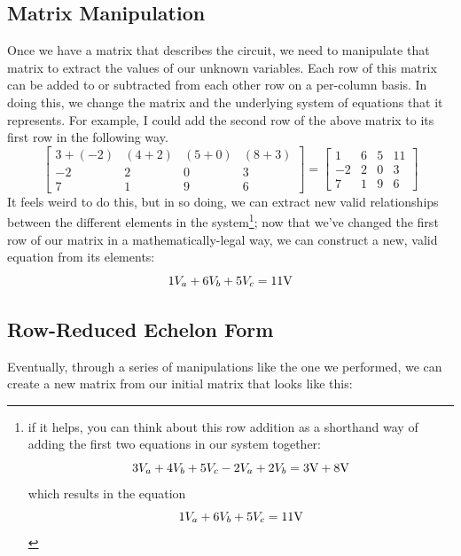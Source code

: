 \subsection{Matrix Manipulation}
Once we have a matrix that describes the circuit, we need to manipulate that matrix to extract the values of our unknown variables. Each row of this matrix can be added to or subtracted from each other row on a per-column basis. In doing this, we change the matrix and the underlying system of equations that it represents. For example, I could add the second row of the above matrix to its first row in the following way.
$$
\begin{bmatrix}
    3 + (-2)   & (4+2) & (5+0) & (8+3) \\
    -2  & 2 & 0 & 3 \\
    7   & 1 & 9 & 6
\end{bmatrix} 
=
\begin{bmatrix}
    1   & 6 & 5 & 11 \\
    -2  & 2 & 0 & 3 \\
    7   & 1 & 9 & 6
\end{bmatrix} 
$$
It feels weird to do this, but in so doing, we can extract new valid relationships between the different elements in the system\footnote{if it helps, you can think about this row addition as a shorthand way of adding the first two equations in our system together: $$3V_a + 4V_b + 5V_c 
-2V_a + 2V_b = 3\textnormal{V}+8\textnormal{V}$$ which results in the equation $$1V_a + 6V_b + 5V_c = 11\textnormal{V}$$}; now that we've changed the first row of our matrix in a mathematically-legal way, we can construct a new, valid equation from its elements:
$$
1V_a + 6V_b + 5V_c = 11\textnormal{V}
$$
\subsection{Row-Reduced Echelon Form}
Eventually, through a series of manipulations like the one we performed, we can create a new matrix from our initial matrix that looks like this:

